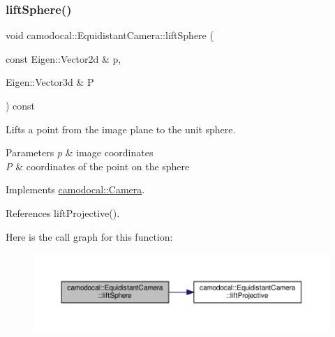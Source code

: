 \subsubsection{\texorpdfstring{lift\+Sphere()}{liftSphere()}}
{\footnotesize\ttfamily void camodocal\+::\+Equidistant\+Camera\+::lift\+Sphere (\begin{DoxyParamCaption}\item[{const Eigen\+::\+Vector2d \&}]{p,  }\item[{Eigen\+::\+Vector3d \&}]{P }\end{DoxyParamCaption}) const\hspace{0.3cm}{\ttfamily [virtual]}}



Lifts a point from the image plane to the unit sphere. 


\begin{DoxyParams}{Parameters}
{\em p} & image coordinates \\
\hline
{\em P} & coordinates of the point on the sphere \\
\hline
\end{DoxyParams}


Implements \hyperlink{classcamodocal_1_1Camera_a77b4ea673c694741302efba6f86a0100}{camodocal\+::\+Camera}.



References lift\+Projective().

Here is the call graph for this function\+:\nopagebreak
\begin{figure}[H]
\begin{center}
\leavevmode
\includegraphics[width=350pt]{classcamodocal_1_1EquidistantCamera_ac86c8527e09b6df4eea4fd3c1322ba00_cgraph}
\end{center}
\end{figure}
\mbox{\label{classcamodocal_1_1EquidistantCamera_a04de4daf1568c2425eabdbade499f927}} 
